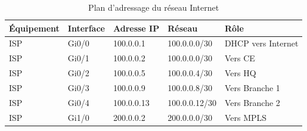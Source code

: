 \documentclass[12pt,a4paper,oneside]{report}
\begin{document}
	
	\begin{table}[H]
		\centering
		\caption{Plan d'adressage du réseau Internet}
		\label{tab:internet}
		
		\begin{tabular}{|p{2.5cm}|p{2cm}|p{3cm}|p{3cm}|p{3cm}|}
			\hline
			\textbf{Équipement} & \textbf{Interface} & \textbf{Adresse IP} & \textbf{Réseau} & \textbf{Rôle} \\
			\hline
			ISP & Gi0/0 & 100.0.0.1 & 100.0.0.0/30 & DHCP vers Internet \\
			\hline
			ISP & Gi0/1 & 100.0.0.2 & 100.0.0.0/30 & Vers CE \\
			\hline
			ISP & Gi0/2 & 100.0.0.5 & 100.0.0.4/30 & Vers HQ \\
			\hline
			ISP & Gi0/3 & 100.0.0.9 & 100.0.0.8/30 & Vers Branche 1 \\
			\hline
			ISP & Gi0/4 & 100.0.0.13 & 100.0.0.12/30 & Vers Branche 2 \\
			\hline
			ISP & Gi1/0 & 200.0.0.2 & 200.0.0.0/30 & Vers MPLS \\
			\hline
		\end{tabular}
	\end{table}
	
	
\end{document}
